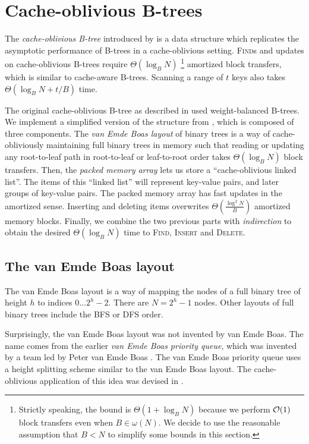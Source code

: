 \chapter{Cache-oblivious B-trees}
\label{chapter:cob}
The \emph{cache-oblivious B-tree} introduced by \cite{cobt}
is a data structure which replicates the asymptotic performance of B-trees
in a cache-oblivious setting.
\textsc{Find}s and updates on cache-oblivious B-trees require $\Theta(\log_B N)$
\footnote{Strictly speaking, the bound is $\Theta(1+\log_B N)$
	because we perform $\mathcal{O}(1)$ block transfers even when $B\in\omega(N)$.
	We decide to use the reasonable assumption that
	$B<N$ to simplify some bounds in this section.}
amortized block transfers, which is similar to cache-aware B-trees.
Scanning a range of $t$ keys also takes $\Theta(\log_B N+t/B)$ time.

The original cache-oblivious B-tree as described in \cite{cobt} used
weight-balanced B-trees. We implement a simplified version of the structure
from \cite{brodal01}, which is composed of three components.
The \emph{van Emde Boas layout} of binary trees is a way of cache-obliviously
maintaining full binary trees in memory such that reading or updating any
root-to-leaf path in root-to-leaf or leaf-to-root order takes $\Theta(\log_B N)$
block transfers.
Then, the \emph{packed memory array} lets us store a ``cache-oblivious linked
list''. The items of this ``linked list'' will represent key-value pairs,
and later groups of key-value pairs.
The packed memory array has fast updates in the amortized sense. Inserting
and deleting items overwrites $\Theta(\frac{\log^2 N}{B})$ amortized memory
blocks.
Finally, we combine the two previous parts with \emph{indirection} to obtain
the desired $\Theta(\log_B N)$ time to \textsc{Find}, \textsc{Insert} and
\textsc{Delete}.

\section{The van Emde Boas layout}
The van Emde Boas layout is a way of mapping the nodes of a full binary
tree of height $h$ to indices $0\ldots 2^h-2$. There are $N=2^h-1$ nodes.
Other layouts of full binary trees include the BFS or DFS order.

Surprisingly, the van Emde Boas layout was not invented by van Emde Boas.
The name comes from the earlier \emph{van Emde Boas priority queue},
which was invented by a team led by Peter van Emde Boas \cite{van-emde-boas}.
The van Emde Boas priority queue uses a height splitting scheme similar
to the van Emde Boas layout. The cache-oblivious application of this idea
was devised in \cite{veb-layout}.

